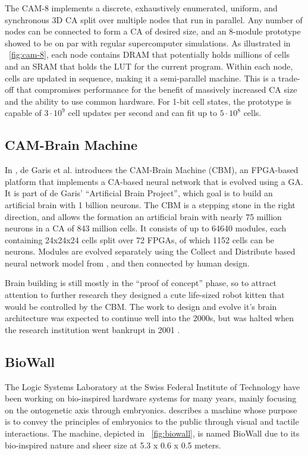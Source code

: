 The CAM-8 implements a discrete, exhaustively enumerated, uniform, and synchronous 3D CA split over multiple nodes that run in parallel.
Any number of nodes can be connected to form a CA of desired size, and an 8-module prototype showed to be on par with regular supercomputer simulations.
As illustrated in \figurename~\ref{fig:cam-8}, each node contains DRAM that potentially holds millions of cells and an SRAM that holds the LUT for the current program.
Within each node, cells are updated in sequence, making it a semi-parallel machine.
This is a trade-off that compromises performance for the benefit of massively increased CA size and the ability to use common hardware.
For 1-bit cell states, the prototype is capable of $3 \cdot 10^9$ cell updates per second and can fit up to $5 \cdot 10^8$ cells.

\subsection{CAM-Brain Machine}

In \cite{degaris2001cbm}, de Garis et al. introduces the CAM-Brain Machine (CBM), an FPGA-based platform that implements a CA-based neural network that is evolved using a GA.
It is part of de Garis' ``Artificial Brain Project'', which goal is to build an artificial brain with 1 billion neurons.
The CBM is a stepping stone in the right direction, and allows the formation an artificial brain with nearly 75 million neurons in a CA of 843 million cells.
It consists of up to 64640 modules, each containing 24x24x24 cells split over 72 FPGAs, of which 1152 cells can be neurons.
Modules are evolved separately using the Collect and Distribute based neural network model from \cite{gers1998codi}, and then connected by human design.

Brain building is still mostly in the ``proof of concept'' phase, so to attract attention to further research they designed a cute life-sized robot kitten that would be controlled by the CBM.
The work to design and evolve it's brain architecture was expected to continue well into the 2000s, but was halted when the research institution went bankrupt in 2001 \cite{giles2001utopian}.

\subsection{BioWall}

The Logic Systems Laboratory at the Swiss Federal Institute of Technology have been working on bio-inspired hardware systems for many years, mainly focusing on the ontogenetic axis through embryonics.
\cite{tempesti2002biowall} describes a machine whose purpose is to convey the principles of embryonics to the public through visual and tactile interactions.
The machine, depicted in \figurename~\ref{fig:biowall}, is named BioWall due to its bio-inspired nature and sheer size at 5.3 x 0.6 x 0.5 meters.

